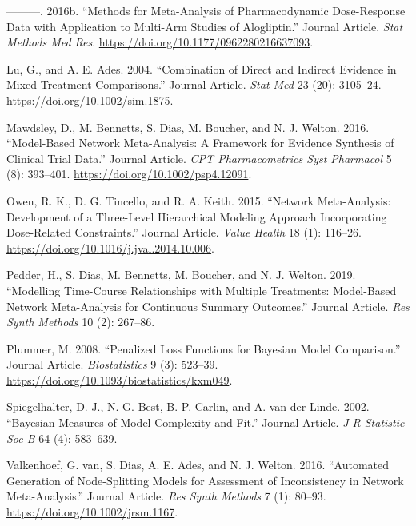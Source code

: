 \documentclass[]{article}
\begin{document}
\leavevmode\hypertarget{ref-langford2016}{}%
---------. 2016b. ``Methods for Meta-Analysis of Pharmacodynamic
Dose-Response Data with Application to Multi-Arm Studies of
Alogliptin.'' Journal Article. \emph{Stat Methods Med Res}.
\url{https://doi.org/10.1177/0962280216637093}.

\leavevmode\hypertarget{ref-lu2004}{}%
Lu, G., and A. E. Ades. 2004. ``Combination of Direct and Indirect
Evidence in Mixed Treatment Comparisons.'' Journal Article. \emph{Stat
Med} 23 (20): 3105--24. \url{https://doi.org/10.1002/sim.1875}.

\leavevmode\hypertarget{ref-mawdsley2016}{}%
Mawdsley, D., M. Bennetts, S. Dias, M. Boucher, and N. J. Welton. 2016.
``Model-Based Network Meta-Analysis: A Framework for Evidence Synthesis
of Clinical Trial Data.'' Journal Article. \emph{CPT Pharmacometrics
Syst Pharmacol} 5 (8): 393--401.
\url{https://doi.org/10.1002/psp4.12091}.

\leavevmode\hypertarget{ref-owen2015}{}%
Owen, R. K., D. G. Tincello, and R. A. Keith. 2015. ``Network
Meta-Analysis: Development of a Three-Level Hierarchical Modeling
Approach Incorporating Dose-Related Constraints.'' Journal Article.
\emph{Value Health} 18 (1): 116--26.
\url{https://doi.org/10.1016/j.jval.2014.10.006}.

\leavevmode\hypertarget{ref-pedder2019}{}%
Pedder, H., S. Dias, M. Bennetts, M. Boucher, and N. J. Welton. 2019.
``Modelling Time-Course Relationships with Multiple Treatments:
Model-Based Network Meta-Analysis for Continuous Summary Outcomes.''
Journal Article. \emph{Res Synth Methods} 10 (2): 267--86.

\leavevmode\hypertarget{ref-plummer2008}{}%
Plummer, M. 2008. ``Penalized Loss Functions for Bayesian Model
Comparison.'' Journal Article. \emph{Biostatistics} 9 (3): 523--39.
\url{https://doi.org/10.1093/biostatistics/kxm049}.

\leavevmode\hypertarget{ref-spiegelhalter2002}{}%
Spiegelhalter, D. J., N. G. Best, B. P. Carlin, and A. van der Linde.
2002. ``Bayesian Measures of Model Complexity and Fit.'' Journal
Article. \emph{J R Statistic Soc B} 64 (4): 583--639.

\leavevmode\hypertarget{ref-vanvalkenhoef2016}{}%
Valkenhoef, G. van, S. Dias, A. E. Ades, and N. J. Welton. 2016.
``Automated Generation of Node-Splitting Models for Assessment of
Inconsistency in Network Meta-Analysis.'' Journal Article. \emph{Res
Synth Methods} 7 (1): 80--93. \url{https://doi.org/10.1002/jrsm.1167}.
\end{document}
